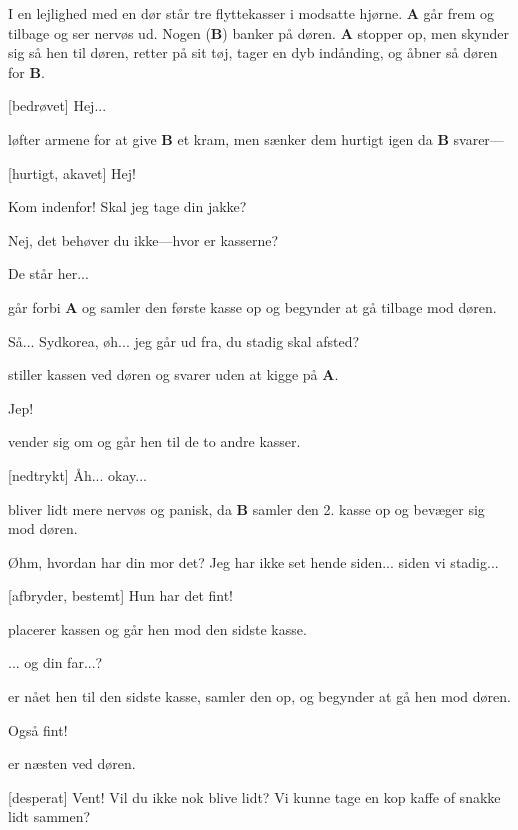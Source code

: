 \documentclass{article}
\newcommand{\rA}{{\color{disc1}\textbf{A}}}
\newcommand{\rB}{{\color{disc2}\textbf{B}}}
\begin{document}
\newpage%
\begin{sketch}

\scene I en lejlighed med en dør står tre flyttekasser i modsatte hjørne.
\rA{} går frem og tilbage og ser nervøs ud. Nogen (\rB{}) banker på døren.
\rA{} stopper op, men skynder sig så hen til døren, retter på sit tøj, tager en
dyb indånding, og åbner så døren for \rB{}.

\says{\rA{}}[bedrøvet] Hej...

\scene \rA{} løfter armene for at give \rB{} et kram, men sænker dem hurtigt
igen da \rB{} svarer---

\says{\rB{}}[hurtigt, akavet] Hej!

\says{\rA{}} Kom indenfor! Skal jeg tage din jakke?

\says{\rB{}} Nej, det behøver du ikke---hvor er kasserne?

\says{\rA{}} De står her... 

\scene \rB{} går forbi \rA{} og samler den første kasse op og begynder at gå
tilbage mod døren.

\says{\rA{}} Så... Sydkorea, øh... jeg går ud fra, du stadig skal afsted?

\scene \rB{} stiller kassen ved døren og svarer uden at kigge på \rA{}.

\says{\rB{}} Jep!

\scene \rB{} vender sig om og går hen til de to andre kasser.

\says{\rA{}}[nedtrykt] Åh... okay...

\scene \rA{} bliver lidt mere nervøs og panisk, da \rB{} samler den 2. kasse
op og bevæger sig mod døren.

\says{\rA{}} Øhm, hvordan har din mor det? Jeg har ikke set hende siden...
siden vi stadig...

\says{\rB{}}[afbryder, bestemt] Hun har det fint!

\scene \rB{} placerer kassen og går hen mod den sidste kasse.

\says{\rA{}} ... og din far...?

\scene \rB{} er nået hen til den sidste kasse, samler den op, og begynder
at gå hen mod døren.

\says{\rB{}} Også fint!

\scene \rB{} er næsten ved døren.

\says{\rA{}}[desperat] Vent!  Vil du ikke nok blive lidt?
Vi kunne tage en kop kaffe of snakke lidt sammen?


\end{sketch}
\end{document}
